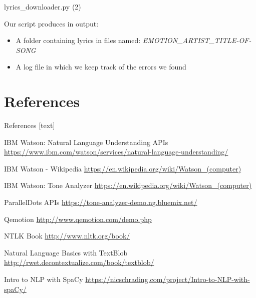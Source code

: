 \documentclass[xcolor=dvipsnames]{beamer}
\begin{document}
\begin{frame}{lyrics\_downloader.py (2)}

Our script produces in output:
\begin{itemize}
\item A folder containing lyrics in files named: \textit{EMOTION\_ARTIST\_TITLE-OF-SONG}
\item A log file in which we keep track of the errors we found
\end{itemize}

\end{frame}


\section{References}
\begin{frame}{References}
[text]
 \begin{thebibliography}{99} %
 IBM Watson: Natural Language Understanding APIs
\footnotesize \url{https://www.ibm.com/watson/services/natural-language-understanding/}

 IBM Watson - Wikipedia
\footnotesize \url{https://en.wikipedia.org/wiki/Watson_(computer)}

 IBM Watson: Tone Analyzer
\footnotesize\url{https://en.wikipedia.org/wiki/Watson_(computer)}

 ParallelDots APIs
\footnotesize \url{https://tone-analyzer-demo.ng.bluemix.net/}

 Qemotion
\footnotesize \url{http://www.qemotion.com/demo.php}

 NTLK Book
\footnotesize \url{http://www.nltk.org/book/}

 Natural Language Basics with TextBlob
\footnotesize\url{http://rwet.decontextualize.com/book/textblob/}

 Intro to NLP with SpaCy
\footnotesize\url{https://nicschrading.com/project/Intro-to-NLP-with-spaCy/}

\end{thebibliography}

\end{frame}
\end{document}

